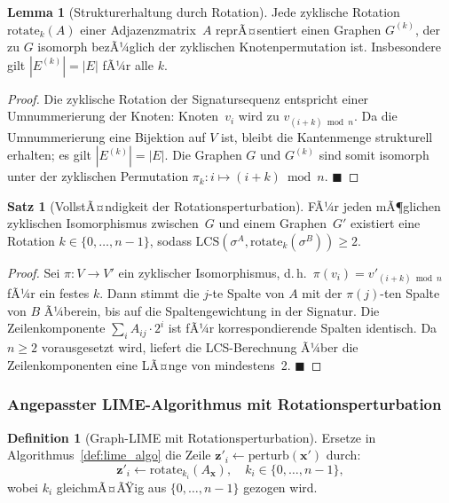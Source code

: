﻿\documentclass[a4paper,12pt]{article}
\theoremstyle{definition}
\newtheorem{definition}{Definition}[section]
\newtheorem{satz}{Satz}[section]
\newtheorem{lemma}{Lemma}[section]
\begin{document}
\begin{lemma}[Strukturerhaltung durch Rotation]
  \label{lem:rotation_preserves}
  Jede zyklische Rotation $\mathrm{rotate}_k(A)$ einer Adjazenzmatrix~$A$
  reprÃ¤sentiert einen Graphen $G^{(k)}$, der zu $G$ isomorph bezÃ¼glich der
  zyklischen Knotenpermutation ist.
  Insbesondere gilt $|E^{(k)}| = |E|$ fÃ¼r alle $k$.
\end{lemma}

\begin{proof}
  Die zyklische Rotation der Signatursequenz entspricht einer Umnummerierung der
  Knoten: Knoten~$v_i$ wird zu $v_{(i+k) \bmod n}$.
  Da die Umnummerierung eine Bijektion auf $V$ ist, bleibt die Kantenmenge strukturell
  erhalten; es gilt $|E^{(k)}| = |E|$.
  Die Graphen $G$ und $G^{(k)}$ sind somit isomorph unter der zyklischen Permutation
  $\pi_k: i \mapsto (i+k) \bmod n$. \hfill$\blacksquare$
\end{proof}

\begin{satz}[VollstÃ¤ndigkeit der Rotationsperturbation]
  \label{satz:rotation_complete}
  FÃ¼r jeden mÃ¶glichen zyklischen Isomorphismus zwischen~$G$ und einem Graphen~$G'$
  existiert eine Rotation $k \in \{0, \ldots, n-1\}$, sodass
  $\mathrm{LCS}(\sigma^A, \mathrm{rotate}_k(\sigma^B)) \geq 2$.
\end{satz}

\begin{proof}
  Sei $\pi: V \to V'$ ein zyklischer Isomorphismus, d.\,h.\ $\pi(v_i) = v'_{(i+k) \bmod n}$
  fÃ¼r ein festes $k$.
  Dann stimmt die $j$-te Spalte von $A$ mit der $\pi(j)$-ten Spalte von $B$ Ã¼berein,
  bis auf die Spaltengewichtung in der Signatur.
  Die Zeilenkomponente $\sum_i A_{ij} \cdot 2^i$ ist fÃ¼r korrespondierende Spalten
  identisch.
  Da $n \geq 2$ vorausgesetzt wird, liefert die LCS-Berechnung Ã¼ber die
  Zeilenkomponenten eine LÃ¤nge von mindestens~2. \hfill$\blacksquare$
\end{proof}

\subsubsection{Angepasster LIME-Algorithmus mit Rotationsperturbation}

\begin{definition}[Graph-LIME mit Rotationsperturbation]
  Ersetze in Algorithmus~\ref{def:lime_algo} die Zeile
  $\mathbf{z}'_i \leftarrow \mathrm{perturb}(\mathbf{x}')$ durch:
  \[
    \mathbf{z}'_i \leftarrow \mathrm{rotate}_{k_i}(A_\mathbf{x}),
    \quad k_i \in \{0, \ldots, n-1\},
  \]
  wobei $k_i$ gleichmÃ¤ÃŸig aus $\{0, \ldots, n-1\}$ gezogen wird.
\end{definition}
\end{document}

